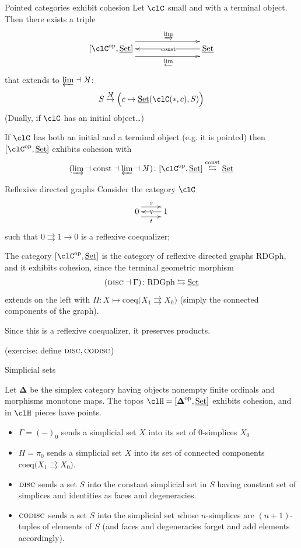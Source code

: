 \documentclass[presentation]{beamer}
\begin{document}
%
%
%
%
%
%
%
\begin{frame}{Pointed categories exhibit cohesion}
  \def\coconst{\rotatebox[origin=c]{180}{$K$}}
  Let $\clC$ small and with a terminal object. Then there exists a triple
  \[
  \xymatrix@C=2cm{
  **[l] [\clC^\text{op},\Set] \ar@<9pt>[r]^\varinjlim \ar@<-9pt>[r]_\varprojlim & \ar[l]|{\text{const}} \Set
  }
  \]
  that extends to $\varprojlim\dashv \coconst$:
  \[
  S\overset{{\footnotesize\coconst}}\mapsto \Big( c\mapsto \Set(\clC(*,c),S) \Big)
  \]
  \onslide<+->
  (Dually, if $\clC$ has an initial object\dots)
  \onslide<+->
  \begin{prop}
    If $\clC$ has both an initial and a terminal object (e.g. it is pointed) then $[\clC^\text{op},\Set]$ exhibits cohesion with
    \[
    (\varinjlim \dashv \text{const} \dashv \varprojlim \dashv \coconst) \colon [\clC^\text{op},\Set] \overset{\text{const}}\leftrightarrows \Set
    \]
  \end{prop}
\end{frame}
%
%
%
%
%
%
%
\begin{frame}{Reflexive directed graphs}
  Consider the category $\clC$
  \[
  \xymatrix{
  0 \ar@<6pt>[r]^s \ar@<-6pt>[r]_t & \ar[l]|q 1
  }
  \]
  such that $0 \rightrightarrows 1 \to 0$ is a reflexive coequalizer;
  
  \onslide<+->
  The category $[\clC^\text{op},\Set]$ is the category of \alert{reflexive directed graphs} $\text{RDGph}$, and it exhibits cohesion, since the terminal geometric morphism
  \[
  (\textsc{disc}\dashv\Gamma)\colon \text{RDGph} \leftrightarrows \underline{\text{Set}}
  \]
  extends on the left with $\Pi\colon X \mapsto \text{coeq}\Big( X_1 \rightrightarrows X_0\Big)$ (simply the connected components of the graph).
  
  Since this is a reflexive coequalizer, it preserves products.
  
  (exercise: define $\textsc{disc}, \textsc{codisc}$)
\end{frame}
%
%
%
%
%
%
%
\begin{frame}{Simplicial sets}
  \begin{prop}
    Let $\boldsymbol\Delta$ be the \alert{simplex category} having objects nonempty finite ordinals and morphisms monotone maps. The topos $\clH=[\boldsymbol\Delta^\text{op}, \Set]$ exhibits cohesion, and in $\clH$ pieces have points.
  \end{prop}
  \begin{itemize}
    \item<+-> $\Gamma = (-)_0$ sends a simplicial set $X$ into its set of 0-simplices $X_0$
    \item<+-> $\Pi=\pi_0$ sends a simplicial set $X$ into its set of connected components $\text{coeq}\Big( X_1 \rightrightarrows X_0\Big)$.
    \item<+-> $\textsc{disc}$ sends a set $S$ into the constant simplicial set in $S$ having constant set of simplices and identities as faces and degeneracies.
    \item<+-> $\textsc{codisc}$ sends a set $S$ into the simplicial set whose $n$-simplices are $(n+1)$-tuples of elements of $S$ (and faces and degeneracies forget and add elements accordingly).
  \end{itemize}
\end{frame}
\end{document}

